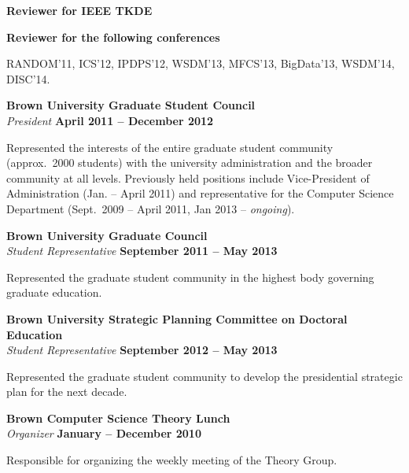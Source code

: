 \documentclass[margin,line]{resume}
\begin{document}
{\bf Reviewer for IEEE TKDE}

{\bf Reviewer for the following conferences}
\begin{list2}
\vspace*{.05in}
\item RANDOM'11, ICS'12, IPDPS'12, WSDM'13, MFCS'13, BigData'13, WSDM'14,
  DISC'14.
\end{list2}

{\bf Brown University Graduate Student Council}\\
{\em President} \hfill {\bf April 2011 -- December 2012}

\begin{list2}
\vspace*{.05in}
\item Represented the interests of the entire graduate student community
  (approx.~2000 students) with the university administration and the broader
  community at all levels. Previously held positions include Vice-President of
  Administration (Jan. -- April 2011) and representative for the Computer Science
  Department (Sept.~2009 -- April 2011, Jan 2013 -- \emph{ongoing}).
\end{list2}

{\bf Brown University Graduate Council}\\
{\em Student Representative} \hfill {\bf September 2011 -- May 2013}

\begin{list2}
\vspace*{.05in}
\item Represented the graduate student community in the highest
  body governing graduate education.
\end{list2}

{\bf Brown University Strategic Planning Committee on Doctoral Education}\\
{\em Student Representative} \hfill {\bf September 2012 -- May 2013}

\begin{list2}
\vspace*{.05in}
\item Represented the graduate student community to develop
  the presidential strategic plan for the next decade.
\end{list2}

{\bf Brown Computer Science Theory Lunch}\\ 
{\em Organizer} \hfill {\bf January -- December 2010 }

\begin{list2}
\vspace*{.05in}
\item Responsible for organizing the weekly meeting of the Theory Group. 
\end{list2}
\end{document}
